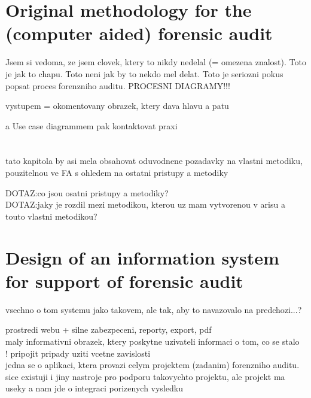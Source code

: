 \newcommand{\komentar}[1]{{\leavevmode\color[rgb]{1.0, 0.13, 0.32}#1}}
\newcommand{\sediva}[1]{{\leavevmode\color[rgb]{0.5, 0.5, 0.5}#1}}
\newcommand{\dotaz}[1]{{\leavevmode\color[rgb]{0.0, 0.5, 1.0}DOTAZ:#1\\}}
\newcommand*{\anglictina}[1]{\noindent\colorbox{green!30}{\parbox{0.98\linewidth}{\textcolor{green!80}{AJ }#1\\}}}


\setcounter{chapter}{0}
\setcounter{section}{1}

 






\chapter{Original methodology for the (computer aided) forensic audit}
\komentar{Jsem si vedoma, ze jsem clovek, ktery to nikdy nedelal (= omezena znalost).
Toto je jak to chapu. Toto neni jak by to nekdo mel delat. Toto je seriozni pokus popsat proces forenzniho auditu.
PROCESNI DIAGRAMY!!!

vystupem = okomentovany obrazek, ktery dava hlavu a patu

a Use case diagrammem pak kontaktovat praxi

}

\chapter{}
\komentar{
tato kapitola by asi mela obsahovat oduvodnene pozadavky na vlastni metodiku, pouzitelnou ve FA s ohledem na ostatni pristupy a metodiky
}

\dotaz{co jsou osatni pristupy a metodiky?}
\dotaz{jaky je rozdil mezi metodikou, kterou uz mam vytvorenou v arisu a touto vlastni metodikou?}


\chapter{Design of an information system for support of forensic audit}
\komentar{
vsechno o tom systemu jako takovem, ale tak, aby to navazovalo na predchozi...?

prostredi webu + silne zabezpeceni, reporty, export, pdf\\
maly informativni obrazek, ktery poskytne uzivateli informaci o tom, co se stalo\\
! pripojit pripady uziti vcetne zavislosti\\

jedna se o aplikaci, ktera provazi celym projektem (zadanim) forenzniho auditu. sice existuji i jiny nastroje pro podporu takovychto projektu, ale projekt ma useky a nam jde o integraci porizenych vysledku

}


